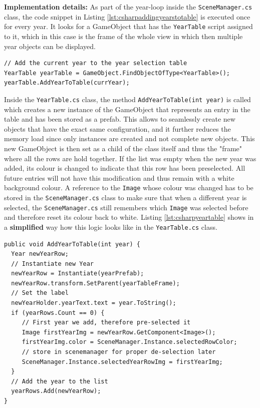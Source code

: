 \textbf{Implementation details:} As part of the year-loop inside the \texttt{SceneManager.cs} class, the code snippet in Listing \ref{lst:csharpaddingyearstotable} is executed once for every year. It looks for a GameObject that has the \texttt{YearTable} script assigned to it, which in this case is the frame of the whole view in which then multiple year objects can be displayed.
\begin{lstlisting}[caption={SceneManager.cs : Adding years to the YearTable}, label={lst:csharpaddingyearstotable}]
// Add the current year to the year selection table
YearTable yearTable = GameObject.FindObjectOfType<YearTable>();
yearTable.AddYearToTable(currYear);
\end{lstlisting}
Inside the \texttt{YearTable.cs} class, the method \texttt{AddYearToTable(int year)} is called which creates a new instance of the GameObject that represents an entry in the table and has been stored as a prefab. This allows to seamlessly create new objects that have the exact same configuration, and it further reduces the memory load since only instances are created and not complete new objects. This new GameObject is then set as a child of the class itself and thus the "frame" where all the rows are hold together. If the list was empty when the new year was added, its colour is changed to indicate that this row has been preselected. All future entries will not have this modification and thus remain with a white background colour. A reference to the \texttt{Image} whose colour was changed has to be stored in the \texttt{SceneManager.cs} class to make sure that when a different year is selected, the \texttt{SceneManager.cs} still remembers which \texttt{Image} was selected before and therefore reset its colour back to white. Listing \ref{lst:csharpyeartable} shows in a \textbf{simplified} way how this logic looks like in the \texttt{YearTable.cs} class.
\begin{lstlisting}[caption={YearTable.cs : Simplification of adding a new year to the table}, label={lst:csharpyeartable}]
public void AddYearToTable(int year) {
  Year newYearRow;
  // Instantiate new Year
  newYearRow = Instantiate(yearPrefab);
  newYearRow.transform.SetParent(yearTableFrame);
  // Set the label
  newYearHolder.yearText.text = year.ToString();
  if (yearRows.Count == 0) {
     // First year we add, therefore pre-selected it
     Image firstYearImg = newYearRow.GetComponent<Image>();
     firstYearImg.color = SceneManager.Instance.selectedRowColor;
     // store in scenemanager for proper de-selection later
     SceneManager.Instance.selectedYearRowImg = firstYearImg;
  }
  // Add the year to the list
  yearRows.Add(newYearRow);
}
\end{lstlisting}


